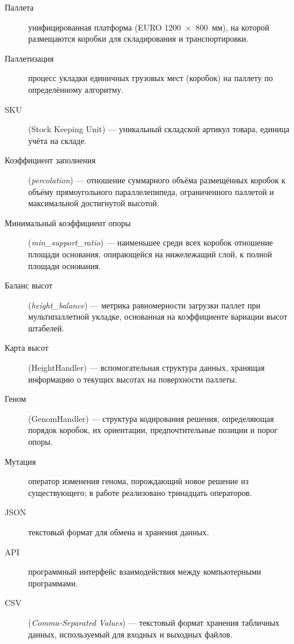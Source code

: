 \Defines

\begin{description}
    \item[Паллета] унифицированная платформа (EURO 1200~$\times$~800~мм), на которой размещаются коробки для складирования и транспортировки.
    \item[Паллетизация] процесс укладки единичных грузовых мест (коробок) на паллету по определённому алгоритму.
    \item[SKU] (Stock Keeping Unit) --- уникальный складской артикул товара, единица учёта на складе.
    \item[Коэффициент заполнения] (\emph{percolation}) --- отношение суммарного объёма размещённых коробок к объёму прямоугольного параллелепипеда, ограниченного паллетой и максимальной достигнутой высотой.
    \item[Минимальный коэффициент опоры] (\emph{min\_support\_ratio}) --- наименьшее среди всех коробок отношение площади основания, опирающейся на нижележащий слой, к полной площади основания.
    \item[Баланс высот] (\emph{height\_balance}) --- метрика равномерности загрузки паллет при мультипаллетной укладке, основанная на коэффициенте вариации высот штабелей.
    \item[Карта высот] (HeightHandler) --- вспомогательная структура данных, хранящая информацию о текущих высотах на поверхности паллеты.
    \item[Геном] (GenomHandler) --- структура кодирования решения, определяющая порядок коробок, их ориентации, предпочтительные позиции и порог опоры.
    \item[Мутация] оператор изменения генома, порождающий новое решение из существующего; в работе реализовано тринадцать операторов.
    \item[JSON] текстовый формат для обмена и хранения данных.
    \item[API] программный интерфейс взаимодействия между компьютерными программами.
    \item[CSV] (\emph{Comma-Separated Values}) --- текстовый формат хранения табличных данных, используемый для входных и выходных файлов.
\end{description}


